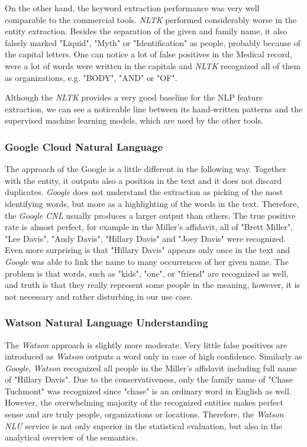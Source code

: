 \documentclass[
  digital, %
  table,   %
  lof,     %
  lot,     %
]{fithesis3}
\begin{document}
On the other hand, the keyword extraction performance was very well comparable to the commercial tools.
\textit{NLTK} performed considerably worse in the entity extraction.
Besides the separation of the given and family name, it also falsely marked "Liquid", "Myth" or "Identification" as people, probably because of the capital letters.
One can notice a lot of false positives in the Medical record, were a lot of words were written in the capitals and \textit{NLTK} recognized all of them as organizations, e.g. "BODY", "AND" or "OF".

Although the \textit{NLTK} provides a very good baseline for the NLP feature extraction, we can see a noticeable line between its hand-written patterns and the supervised machine learning models, which are used by the other tools.

\subsubsection{\textbf{Google Cloud Natural Language}}
The approach of the Google is a little different in the following way.
Together with the entity, it outputs also a position in the text and it does not discard duplicates.
\textit{Google} does not understand the extraction as picking of the most identifying words, but more as a highlighting of the words in the text.
Therefore, the \textit{Google CNL} usually produces a larger output than others.
The true positive rate is almost perfect, for example in the Miller's affidavit, all of "Brett Miller", "Lee Davis", "Andy Davis", "Hillary Davis" and "Joey Davis" were recognized.
Even more surprising is that "Hillary Davis" appears only once in the text and \textit{Google} was able to link the name to many occurrences of her given name.
The problem is that words, such as "kids", "one", or "friend" are recognized as well, and truth is that they really represent some people in the meaning, however, it is not necessary and rather disturbing in our use case.

\subsubsection{\textbf{Watson Natural Language Understanding}}
The \textit{Watson} approach is slightly more moderate.
Very little false positives are introduced as \textit{Watson} outputs a word only in case of high confidence.
Similarly as \textit{Google}, \textit{Watson} recognized all people in the Miller's affidavit including full name of "Hillary Davis".
Due to the conservativeness, only the family name of "Chase Tuchmont" was recognized since "chase" is an ordinary word in English as well.
However, the overwhelming majority of the recognized entities makes perfect sense and are truly people, organizations or locations.
Therefore, the \textit{Watson NLU} service is not only superior in the statistical evaluation, but also in the analytical overview of the semantics.
\end{document}
